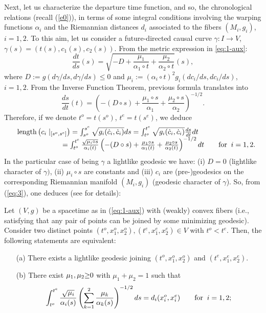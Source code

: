 Next, let us characterize the departure time function, and so, the chronological relations (recall (\ref{e0})), in terms of some integral conditions involving the warping functions $\alpha_i$ and the Riemannian distances $d_i$ associated to the fibers $(M_i,g_i)$, $i=1,2$.
To this aim, let us consider a future-directed causal curve $\gamma:  I \rightarrow V$,
$\gamma(s)=(t(s),c_{1}(s),c_{2}(s))$. From the metric expression in \eqref{eq:1-aux}:
\[
\frac{dt}{ds}(s)=\sqrt{-D+\frac{\mu_{1}}{\alpha_{1}\circ
t}+\frac{\mu_{2}}{\alpha_{2}\circ t}}(s),
\]
where $D:=g(d\gamma/ds,d\gamma/ds)\leq 0$ and
$\mu_{i}:=(\alpha_{i}\circ t)^2 g_{i}(dc_{i}/ds,dc_{i}/ds)$,
$i=1,2$. From the Inverse Function Theorem, previous formula translates into
\[
\frac{ds}{dt}(t)=\left(-(D\circ s)+\frac{\mu_{1}\circ s}{\alpha
_{1}}+\frac{\mu_{2}\circ s}{\alpha _{2}}\right)^{-1/2}.
\]
Therefore, if we denote $t^{o}=t(s^{o})$, $t^{e}=t(s^{e})$, we
deduce
\begin{equation}\label{eq:3}
\begin{array}{c}
\hbox{length}\left(c_{i}\mid_{[s^{o},s^{e}]}\right)=\int_{s^{o}}^{s^{e}}\sqrt{g_{i}(\dot
c_{i}, \dot c_{i})} ds=\int_{t^o}^{t^e}\sqrt{g_{i}(\dot c_{i}, \dot
c_{i})} \frac{ds}{dt} dt \qquad\qquad\qquad\quad \\
\;\quad\qquad\qquad\qquad =\int_{t^o}^{t^e}\frac{\sqrt{\mu_{i}\circ
s}}{\alpha_i(t)}\left(-(D\circ s)+\frac{\mu_{1}\circ
s}{\alpha_{1}(t)}+\frac{\mu_{2}\circ s}{\alpha_{2}(t)}\right)^{-1/2}dt
\qquad\hbox{for}\;\; i=1,2.
\end{array}
\end{equation}
In the particular case of being $\gamma$ a lightlike geodesic we have: (i) $D=0$ (lightlike character of $\gamma)$, (ii) $\mu_i\circ s$ are constants and (iii) $c_i$ are (pre-)geodesics on the corresponding Riemannian manifold $(M_i,g_i)$ (geodesic character of $\gamma$). So, from (\ref{eq:3}), one deduces (see \cite[Theorem 2]{FS} for details):
\begin{prop}\label{thm:characluzgeodesics}
  Let $(V,g)$ be a {\multiwarped} spacetime as in (\ref{eq:1-aux}) with (weakly) convex fibers (i.e., satisfying that any pair of points can be joined by some minimizing geodesic). Consider two distinct points $(t^o,x_1^o,x_2^o),(t^e,x_1^e,x_2^e)\in V$ with $t^o<t^e$. Then, the following statements are equivalent:
  \begin{itemize}
  \item[(a)] There exists a lightlike geodesic joining $(t^o,x_1^o,x_2^o)$ and $(t^e,x_1^e,x_2^e)$.
  \item[(b)] There exist $\mu_1,\mu_2 {\color{black} \geq}0$ with $\mu_1+\mu_2=1$ such that
    \[
\int_{t^o}^{t^{e}} \frac{\sqrt{\mu_{i}}}{\alpha_{i}(s)}\left(\sum_{k=1}^{2} \frac{\mu_{k}}{\alpha_{k}(s)} \right)^{-1/2}ds=d_{i}(x^{o}_{i},x^{e}_{i})\qquad\hbox{for}\;\;
i=1,2;
      \]

  \end{itemize}

\end{prop}


